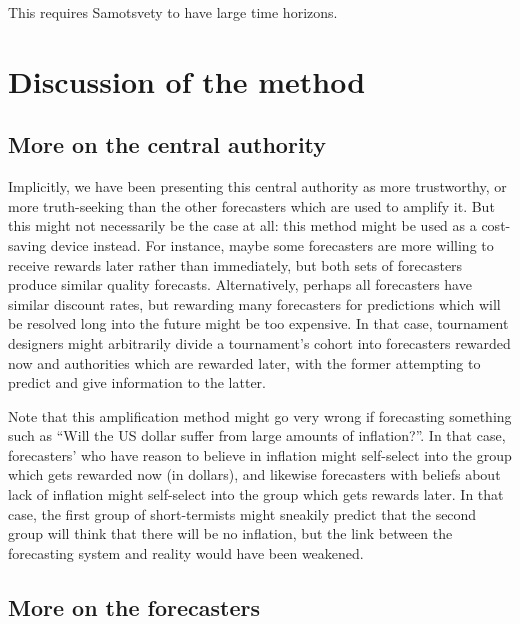 \documentclass[]{article}
\begin{document}
This requires Samotsvety to have large time horizons.

\hypertarget{discussion-of-the-method}{%
\section{Discussion of the method}\label{discussion-of-the-method}}

\hypertarget{more-on-the-central-authority}{%
\subsection{More on the central
authority}\label{more-on-the-central-authority}}

Implicitly, we have been presenting this central authority as more
trustworthy, or more truth-seeking than the other forecasters which are
used to amplify it. But this might not necessarily be the case at all:
this method might be used as a cost-saving device instead. For instance,
maybe some forecasters are more willing to receive rewards later rather
than immediately, but both sets of forecasters produce similar quality
forecasts. Alternatively, perhaps all forecasters have similar discount
rates, but rewarding many forecasters for predictions which will be
resolved long into the future might be too expensive. In that case,
tournament designers might arbitrarily divide a tournament's cohort into
forecasters rewarded now and authorities which are rewarded later, with
the former attempting to predict and give information to the latter.

Note that this amplification method might go very wrong if forecasting
something such as ``Will the US dollar suffer from large amounts of
inflation?''. In that case, forecasters' who have reason to believe in
inflation might self-select into the group which gets rewarded now (in
dollars), and likewise forecasters with beliefs about lack of inflation
might self-select into the group which gets rewards later. In that case,
the first group of short-termists might sneakily predict that the second
group will think that there will be no inflation, but the link between
the forecasting system and reality would have been weakened.

\hypertarget{more-on-the-forecasters}{%
\subsection{More on the forecasters}\label{more-on-the-forecasters}}
\end{document}
